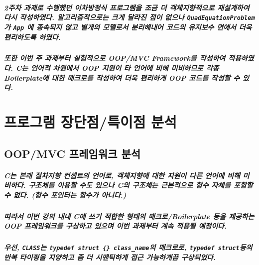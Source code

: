 \documentclass[UTF8]{report}
\begin{document}
            \paragraph{%
                \normalfont 2주차 과제로 수행했던 이차방정식 프로그램을 조금 더 객체지향적으로 재설계하여 다시 작성하였다. 알고리즘적으로는 크게 달라진 점이 없으나 \texttt{QuadEquationProblem}가 \texttt{App} 에 종속되지 않고 별개의 모델로서 분리해내어 코드의 유지보수 면에서 더욱 편리하도록 하였다.
            }

            \paragraph{%
                \normalfont 또한 이번 주 과제부터 실험적으로 OOP/MVC Framework를 작성하여 적용하였다. C는 언어적 차원에서 OOP 지원이 타 언어에 비해 미비하므로 각종 Boilerplate에 대한 매크로를 작성하여 더욱 편리하게 OOP 코드를 작성할 수 있다.
            }
            
    \chapter{프로그램 장단점/특이점 분석}
        \section{OOP/MVC 프레임워크 분석}
            \paragraph{%
                \normalfont C는 본래 절차지향 컨셉트의 언어로, 객체지향에 대한 지원이 다른 언어에 비해 미비하다. 구조체를 이용할 수도 있으나 C의 구조체는 근본적으로 함수 자체를 포함할 수 없다. (함수 포인터는 함수가 아니다.)
            }

            \paragraph{%
                \normalfont 따라서 이번 강의 내내 C에 쓰기 적합한 형태의 매크로/Boilerplate 등을 제공하는 OOP 프레임워크를 구상하고 있으며 이번 과제부터 계속 적용될 예정이다.
            }

            \paragraph{%
                \normalfont 우선, \texttt{CLASS}는 \texttt{typedef struct \{\} class\_name}의 매크로로, \texttt{typedef struct}등의 반복 타이핑을 지양하고 좀 더 시맨틱하게 접근 가능하게끔 구상되었다.
            }
\end{document}
